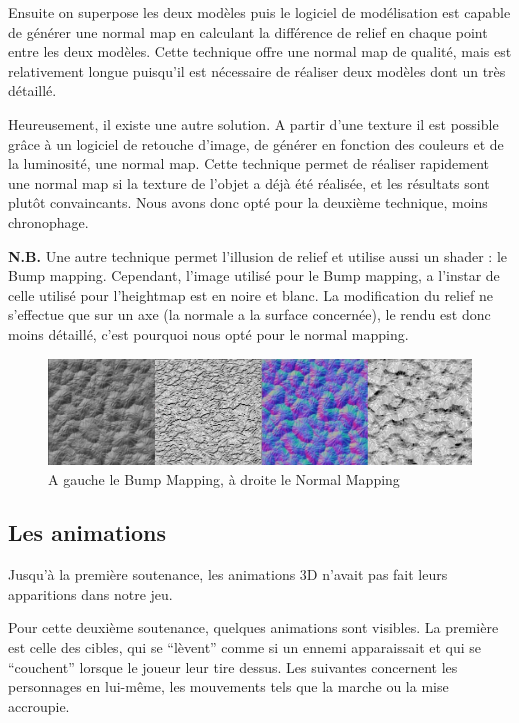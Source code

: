 \documentclass[11pt]{report}
\begin{document}
Ensuite on superpose les deux modèles puis le logiciel de modélisation est capable de générer une normal map en calculant la différence de relief en chaque point entre les deux modèles.
Cette technique offre une normal map de qualité, mais est relativement longue puisqu’il est nécessaire de réaliser deux modèles dont un très détaillé.

Heureusement, il existe une autre solution. A partir d’une texture il est possible grâce à un logiciel de retouche d’image, de générer en fonction des couleurs et de la luminosité, une normal map.
Cette technique permet de réaliser rapidement une normal map si la texture de l’objet a déjà été réalisée, et les résultats sont plutôt convaincants. Nous avons donc opté pour la deuxième technique, moins chronophage.

\noindent\textbf{N.B.} Une autre technique permet l’illusion de relief et utilise aussi un shader : le Bump mapping. Cependant, l’image utilisé pour le Bump mapping, a l’instar de celle utilisé pour l’heightmap est en noire et blanc. La modification du relief ne s’effectue que sur un axe (la normale a la surface concernée), le rendu est donc moins détaillé, c’est pourquoi nous opté pour le normal mapping.

\begin{figure}[htbp]
\centering
\includegraphics[scale=0.38]{bump_vs_normal.png}
\caption{A gauche le Bump Mapping, à droite le Normal Mapping}
\end{figure}

\subsection{Les animations}

Jusqu’à la première soutenance, les animations 3D n’avait pas fait leurs apparitions dans notre jeu.

Pour cette deuxième soutenance, quelques animations sont visibles. La première est celle des cibles, qui se ``lèvent'' comme si un ennemi apparaissait et qui se ``couchent'' lorsque le joueur leur tire dessus. Les suivantes concernent les personnages en lui-même, les mouvements tels que la marche ou la mise accroupie. 
\end{document}
